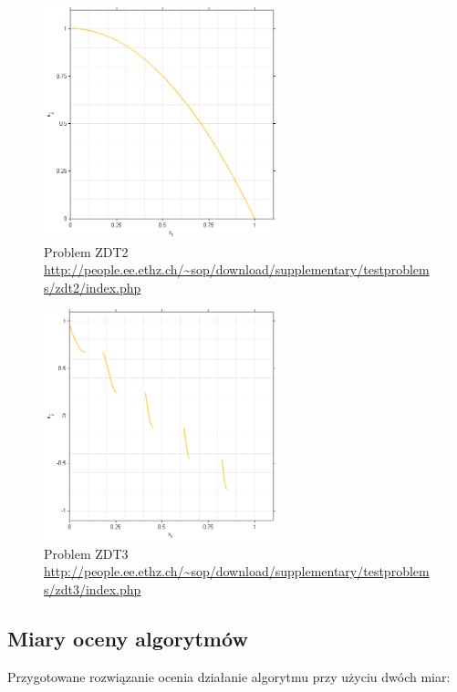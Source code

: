 \documentclass{classrep}
\begin{document}
\begin{figure}[H]
    \centering
    \includegraphics[width=0.6\textwidth]{img2/zdt2.png}
    \caption{Problem ZDT2 \url{http://people.ee.ethz.ch/~sop/download/supplementary/testproblems/zdt2/index.php}}
\end{figure}

\begin{figure}[H]
    \centering
    \includegraphics[width=0.6\textwidth]{img2/zdt3.png}
    \caption{Problem ZDT3 \url{http://people.ee.ethz.ch/~sop/download/supplementary/testproblems/zdt3/index.php}}
\end{figure}


\subsection{Miary oceny algorytmów}

Przygotowane rozwiązanie ocenia działanie algorytmu przy użyciu dwóch miar:
\end{document}
